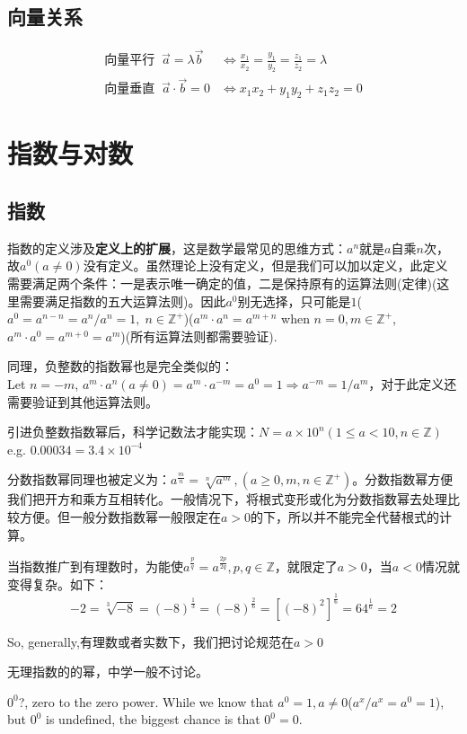 \documentclass[../main.tex]{subfiles}
\begin{document}
\subsection{向量关系}
\[
\begin{array}{ll}
  \text{向量平行} \;\; \vec{a}=\lambda\vec{b}&\Leftrightarrow \frac{x_1}{x_2}=\frac{y_1}{y_{2}}=\frac{z_1}{z_2} = \lambda \\
  \text{向量垂直} \;\; \vec{a}\cdot\vec{b}=0&\Leftrightarrow x_1x_2+y_1y_2+z_1z_2=0
\end{array}
\]
\newpage
\section{指数与对数}
\subsection{指数}
指数的定义涉及\textbf{定义上的扩展}，这是数学最常见的思维方式：$a^n$就是$a$自乘$n$次，故$a^0(a\neq 0)$没有定义。虽然理论上没有定义，但是我们可以加以定义，此定义需要满足两个条件：一是表示唯一确定的值，二是保持原有的运算法则(定律)(这里需要满足指数的五大运算法则)。因此$a^0$别无选择，只可能是$1$($a^0=a^{n-n}=a^n/a^n=1, \; n\in \mathbb{Z^+}$)($a^m\cdot a^n=a^{m+n}$ when $n=0, m\in \mathbb{Z^+}$, $a^m\cdot a^0 = a^{m+0}=a^m$)(所有运算法则都需要验证).

同理，负整数的指数幂也是完全类似的：\\
Let $n=-m$, $a^m\cdot a^n(a\neq 0)=a^m\cdot a^{-m}=a^0=1 \Rightarrow a^{-m}=1/a^m$，对于此定义还需要验证到其他运算法则。

引进负整数指数幂后，科学记数法才能实现：$N=a\times 10^n(1\leq a <10, n\in \mathbb{Z} )$\\
e.g. $0.00034=3.4\times 10^{-4}$

分数指数幂同理也被定义为：$a^{\frac{m}{n}}=\sqrt[n]{a^m},(a\geq 0, m,n\in \mathbb{Z^+})$。分数指数幂方便我们把开方和乘方互相转化。一般情况下，将根式变形或化为分数指数幂去处理比较方便。但一般分数指数幂一般限定在$a>0$的下，所以并不能完全代替根式的计算。

当指数推广到有理数时，为能使$a^{\frac{p}{q}}=a^{\frac{2p}{2q}}, p,q \in \mathbb{Z}$，就限定了$a>0$，当$a<0$情况就变得复杂。如下：
\[
  -2=\sqrt[3]{-8}=(-8)^{\frac{1}{3}}=(-8)^{\frac{2}{6}}=[(-8)^2]^{\frac{1}{6}}=64^{\frac{1}{6}}=2
\]

So, generally,有理数或者实数下，我们把讨论规范在$a>0$

无理指数的的幂，中学一般不讨论。

$0^0$?, zero to the zero power. While we know that $a^0=1, a\ne 0$($a^x/a^x=a^0=1$), but $0^0$ is undefined, the biggest chance is that $0^0=0$.
\end{document}
